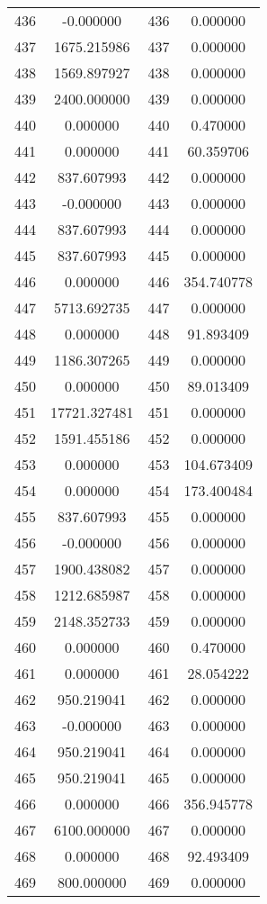 \documentclass[12pt]{article}
\begin{document}
\begin{longtable}{@{}cccc@{}}
436 & -0.000000 & 436 & 0.000000 \\
437 & 1675.215986 & 437 & 0.000000 \\
438 & 1569.897927 & 438 & 0.000000 \\
439 & 2400.000000 & 439 & 0.000000 \\
440 & 0.000000 & 440 & 0.470000 \\
441 & 0.000000 & 441 & 60.359706 \\
442 & 837.607993 & 442 & 0.000000 \\
443 & -0.000000 & 443 & 0.000000 \\
444 & 837.607993 & 444 & 0.000000 \\
445 & 837.607993 & 445 & 0.000000 \\
446 & 0.000000 & 446 & 354.740778 \\
447 & 5713.692735 & 447 & 0.000000 \\
448 & 0.000000 & 448 & 91.893409 \\
449 & 1186.307265 & 449 & 0.000000 \\
450 & 0.000000 & 450 & 89.013409 \\
451 & 17721.327481 & 451 & 0.000000 \\
452 & 1591.455186 & 452 & 0.000000 \\
453 & 0.000000 & 453 & 104.673409 \\
454 & 0.000000 & 454 & 173.400484 \\
455 & 837.607993 & 455 & 0.000000 \\
456 & -0.000000 & 456 & 0.000000 \\
457 & 1900.438082 & 457 & 0.000000 \\
458 & 1212.685987 & 458 & 0.000000 \\
459 & 2148.352733 & 459 & 0.000000 \\
460 & 0.000000 & 460 & 0.470000 \\
461 & 0.000000 & 461 & 28.054222 \\
462 & 950.219041 & 462 & 0.000000 \\
463 & -0.000000 & 463 & 0.000000 \\
464 & 950.219041 & 464 & 0.000000 \\
465 & 950.219041 & 465 & 0.000000 \\
466 & 0.000000 & 466 & 356.945778 \\
467 & 6100.000000 & 467 & 0.000000 \\
468 & 0.000000 & 468 & 92.493409 \\
469 & 800.000000 & 469 & 0.000000 \\

\end{longtable}
\end{document}
